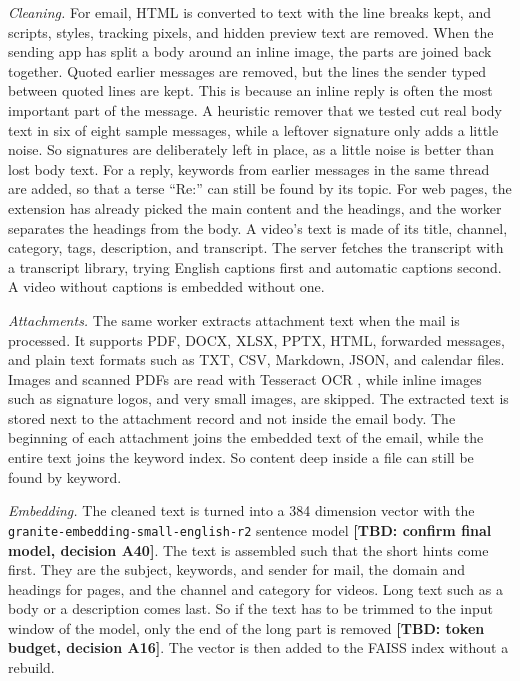 \documentclass[conference]{IEEEtran}
\newcommand{\embmodel}{\texttt{granite\allowbreak-embedding\allowbreak-small\allowbreak-english\allowbreak-r2}}
\newcommand{\embdim}{384}
\newcommand{\tbd}[1]{\textbf{[TBD: #1]}}
\begin{document}
\textit{Cleaning.} For email, HTML is converted to text with the line breaks kept, and scripts, styles, tracking pixels, and hidden preview text are removed. When the sending app has split a body around an inline image, the parts are joined back together. Quoted earlier messages are removed, but the lines the sender typed between quoted lines are kept. This is because an inline reply is often the most important part of the message. A heuristic remover that we tested cut real body text in six of eight sample messages, while a leftover signature only adds a little noise. So signatures are deliberately left in place, as a little noise is better than lost body text. For a reply, keywords from earlier messages in the same thread are added, so that a terse ``Re:'' can still be found by its topic. For web pages, the extension has already picked the main content and the headings, and the worker separates the headings from the body. A video's text is made of its title, channel, category, tags, description, and transcript. The server fetches the transcript with a transcript library, trying English captions first and automatic captions second. A video without captions is embedded without one.

\textit{Attachments.} The same worker extracts attachment text when the mail is processed. It supports PDF, DOCX, XLSX, PPTX, HTML, forwarded messages, and plain text formats such as TXT, CSV, Markdown, JSON, and calendar files. Images and scanned PDFs are read with Tesseract OCR \cite{b15}, while inline images such as signature logos, and very small images, are skipped. The extracted text is stored next to the attachment record and not inside the email body. The beginning of each attachment joins the embedded text of the email, while the entire text joins the keyword index. So content deep inside a file can still be found by keyword.

\textit{Embedding.} The cleaned text is turned into a \embdim{} dimension vector with the \embmodel{} sentence model \tbd{confirm final model, decision A40}. The text is assembled such that the short hints come first. They are the subject, keywords, and sender for mail, the domain and headings for pages, and the channel and category for videos. Long text such as a body or a description comes last. So if the text has to be trimmed to the input window of the model, only the end of the long part is removed \tbd{token budget, decision A16}. The vector is then added to the FAISS index without a rebuild.
\end{document}
